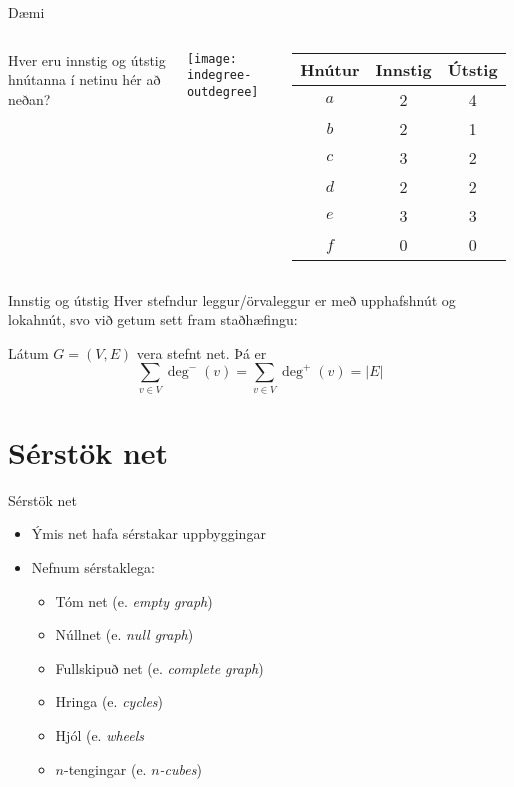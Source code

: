 \documentclass{beamer}
\begin{document}
\begin{frame}{Dæmi}
\begin{columns}
Hver eru innstig og útstig hnútanna í netinu hér að neðan?

\vspace{0.5cm}
\texttt{[image: indegree-outdegree]}
\pause
{}
\begin{tabular}{ccc}
\toprule
Hnútur&Innstig&Útstig\\
\midrule
$a$&2&4\\
$b$&2&1\\
$c$&3&2\\
$d$&2&2\\
$e$&3&3\\
$f$&0&0\\
\bottomrule
\end{tabular}
\end{columns}
\end{frame}

\begin{frame}{Innstig og útstig}
Hver stefndur leggur/örvaleggur er með upphafshnút og lokahnút, svo við getum sett fram staðhæfingu:

\begin{tcolorbox}
Látum $G = (V,E)$ vera stefnt net. Þá er
\[
\sum_{v\in V} \deg^-(v) = \sum_{v\in V} \deg^+(v) = |E|
\]
\end{tcolorbox}

\end{frame}

\section{Sérstök net}

\begin{frame}{Sérstök net}
\begin{itemize}
 \item Ýmis net hafa sérstakar uppbyggingar
 \item Nefnum sérstaklega:
 \begin{itemize}
  \item Tóm net (e. \emph{empty graph})
  \item Núllnet (e. \emph{null graph})
  \item Fullskipuð net (e. \emph{complete graph})
  \item Hringa (e. \emph{cycles})
  \item Hjól (e. \emph{wheels}
  \item $n$-tengingar (e. \emph{$n$-cubes})
 \end{itemize}
\end{itemize}
\end{frame}
\end{document}
